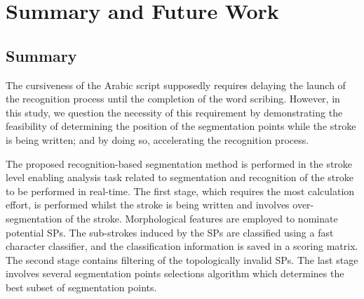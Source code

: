%
%
%

\chapter{Summary and Future Work}
\label{chap:summary}

\section{Summary}
\label{sec:summary}

The cursiveness of the Arabic script supposedly requires delaying the launch of the recognition process until the completion of the word scribing. 
However, in this study, we question the necessity of this requirement by demonstrating the feasibility of determining the position of the segmentation points while the stroke is being written; and by doing so, accelerating the recognition process.

The proposed recognition-based segmentation method is performed in the stroke level enabling analysis task related to segmentation and recognition of the stroke to be performed in real-time. 
The first stage, which requires the most calculation effort, is performed whilst the stroke is being written and involves over-segmentation of the stroke.
Morphological features are employed to nominate potential SPs.
The sub-strokes induced by the SPs are classified using a fast character classifier, and the classification information is saved in a scoring matrix.
The second stage contains filtering of the topologically invalid SPs. 
The last stage involves several segmentation points selections algorithm which determines the best subset of segmentation points.

